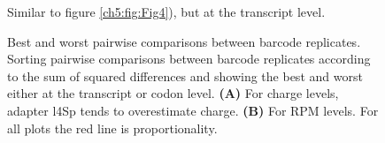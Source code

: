 \begin{figure}[ht]
    \centering
    \caption[Charge and RPM deviation at the transcript level.]{
    Similar to figure \ref{ch5:fig:Fig4}), but at the transcript level.
    }
    \label{ch5:figsupp:f4S1}
\end{figure}


\begin{figure}[ht]
    \centering
    \caption[Best and worst barcode replicates.]{
    Best and worst pairwise comparisons between barcode replicates.
    Sorting pairwise comparisons between barcode replicates according to the sum of squared differences and showing the best and worst either at the transcript or codon level.
    \textbf{(A)} For charge levels, adapter l4Sp tends to overestimate charge.
    \textbf{(B)} For RPM levels.
    For all plots the red line is proportionality.
    }
    \label{ch5:figsupp:f4S2}
\end{figure}



